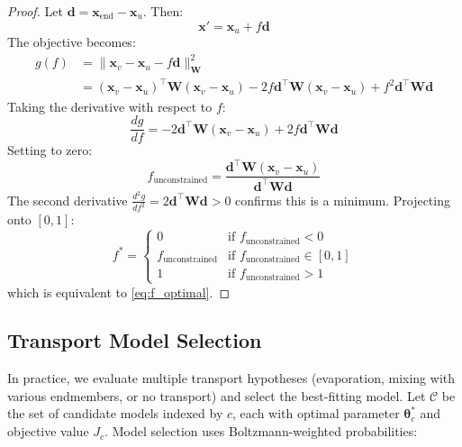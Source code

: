 \documentclass[12pt,a4paper]{article}
\theoremstyle{plain}
\theoremstyle{definition}
\theoremstyle{remark}
\begin{document}
\begin{proof}
	Let $\mathbf{d} = \mathbf{x}_{\text{end}} - \mathbf{x}_u$. Then:
	\begin{equation}
		\mathbf{x}' = \mathbf{x}_u + f \mathbf{d}
	\end{equation}
	The objective becomes:
	\begin{align}
		g(f) & = \|\mathbf{x}_v - \mathbf{x}_u - f\mathbf{d}\|_{\mathbf{W}}^2                                                                                                                          \\
		     & = (\mathbf{x}_v - \mathbf{x}_u)^\top \mathbf{W} (\mathbf{x}_v - \mathbf{x}_u) - 2f \mathbf{d}^\top \mathbf{W} (\mathbf{x}_v - \mathbf{x}_u) + f^2 \mathbf{d}^\top \mathbf{W} \mathbf{d}
	\end{align}
	Taking the derivative with respect to $f$:
	\begin{equation}
		\frac{dg}{df} = -2 \mathbf{d}^\top \mathbf{W} (\mathbf{x}_v - \mathbf{x}_u) + 2f \mathbf{d}^\top \mathbf{W} \mathbf{d}
	\end{equation}
	Setting to zero:
	\begin{equation}
		f_{\text{unconstrained}} = \frac{\mathbf{d}^\top \mathbf{W} (\mathbf{x}_v - \mathbf{x}_u)}{\mathbf{d}^\top \mathbf{W} \mathbf{d}}
	\end{equation}
	The second derivative $\frac{d^2g}{df^2} = 2\mathbf{d}^\top \mathbf{W} \mathbf{d} > 0$ confirms this is a minimum. Projecting onto $[0,1]$:
	\begin{equation}
		f^* = \begin{cases}
			0                        & \text{if } f_{\text{unconstrained}} < 0       \\
			f_{\text{unconstrained}} & \text{if } f_{\text{unconstrained}} \in [0,1] \\
			1                        & \text{if } f_{\text{unconstrained}} > 1
		\end{cases}
	\end{equation}
	which is equivalent to \eqref{eq:f_optimal}.
\end{proof}

\subsection{Transport Model Selection}

In practice, we evaluate multiple transport hypotheses (evaporation, mixing with various endmembers, or no transport) and select the best-fitting model. Let $\mathcal{C}$ be the set of candidate models indexed by $c$, each with optimal parameter $\boldsymbol{\theta}_c^*$ and objective value $J_c$. Model selection uses Boltzmann-weighted probabilities:
\end{document}
